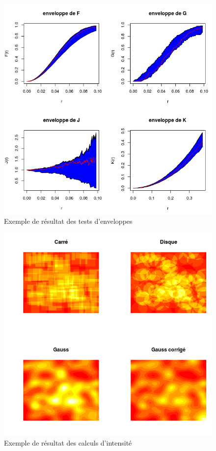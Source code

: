 \documentclass[stage2a]{tnreport}
\begin{document}
\vspace*{2cm}
\begin{center}
\begin{figure}[h]
  \centering
  \includegraphics[scale=0.7]{figures/calculEnveloppes.png}
  \caption{Exemple de résultat des tests d'enveloppes}
  \label{fig:testEnveloppe}
\end{figure}
\end{center}

\cleardoublepage

\vspace*{2cm}
\begin{center}
\begin{figure}[h]
  \centering
  \includegraphics[scale=0.7]{figures/intensite.png}
  \caption{Exemple de résultat des calculs d'intensité}
  \label{fig:testIntensite}
\end{figure}
\end{center}
\end{document}
